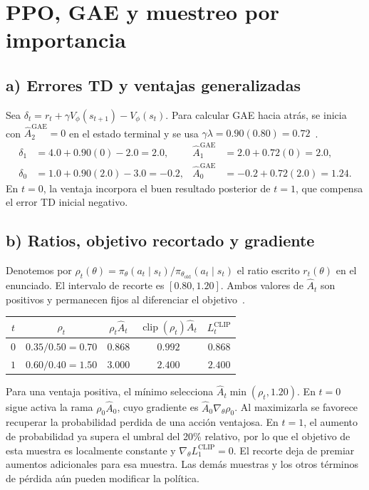 \section{PPO, GAE y muestreo por importancia}

\subsection*{a) Errores TD y ventajas generalizadas}

Sea $\delta_t=r_t+\gamma V_\phi(s_{t+1})-V_\phi(s_t)$. Para calcular GAE hacia atrás, se inicia con $\widehat A_2^{\mathrm{GAE}}=0$ en el estado terminal y se usa $\gamma\lambda=0.90(0.80)=0.72$~\cite[secc.~3]{schulman2016}.
\begin{align*}
    \delta_1&=4.0+0.90(0)-2.0=2.0, &
    \widehat A_1^{\mathrm{GAE}}&=2.0+0.72(0)=\boxed{2.0},\\
    \delta_0&=1.0+0.90(2.0)-3.0=-0.2, &
    \widehat A_0^{\mathrm{GAE}}&=-0.2+0.72(2.0)=\boxed{1.24}.
\end{align*}
En $t=0$, la ventaja incorpora el buen resultado posterior de $t=1$, que compensa el error TD inicial negativo.

\subsection*{b) Ratios, objetivo recortado y gradiente}

Denotemos por $\rho_t(\theta)=\pi_\theta(a_t\mid s_t)/\pi_{\theta_{\mathrm{old}}}(a_t\mid s_t)$ el ratio escrito $r_t(\theta)$ en el enunciado. El intervalo de recorte es $[0.80,1.20]$. Ambos valores de $\widehat A_t$ son positivos y permanecen fijos al diferenciar el objetivo~\cite[secc.~3]{schulman2017}.
\begin{center}
    \begin{tabular}{ccccc}
        \toprule
        $t$ & $\rho_t$ & $\rho_t\widehat A_t$ &
        $\operatorname{clip}(\rho_t)\widehat A_t$ & $L_t^{\mathrm{CLIP}}$ \\
        \midrule
        $0$ & $0.35/0.50=0.70$ & $0.868$ & $0.992$ & $0.868$ \\
        $1$ & $0.60/0.40=1.50$ & $3.000$ & $2.400$ & $2.400$ \\
        \bottomrule
    \end{tabular}
\end{center}
Para una ventaja positiva, el mínimo selecciona $\widehat A_t\min(\rho_t,1.20)$. En $t=0$ sigue activa la rama $\rho_0\widehat A_0$, cuyo gradiente es $\widehat A_0\nabla_\theta\rho_0$. Al maximizarla se favorece recuperar la probabilidad perdida de una acción ventajosa. En $t=1$, el aumento de probabilidad ya supera el umbral del 20\% relativo, por lo que el objetivo de esta muestra es localmente constante y $\boxed{\nabla_\theta L_1^{\mathrm{CLIP}}=0}$. El recorte deja de premiar aumentos adicionales para esa muestra. Las demás muestras y los otros términos de pérdida aún pueden modificar la política.

